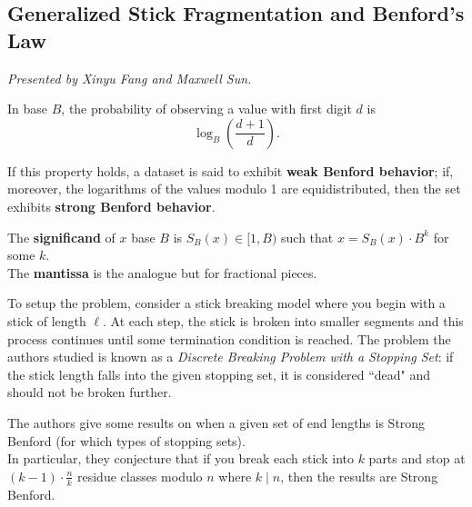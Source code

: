 \documentclass[12pt]{amsart}
\begin{document}
\vspace{2cm}

\subsection{Generalized Stick Fragmentation and Benford's Law}

\textit{}
\vspace{0.25cm}

\textit{Presented by Xinyu Fang and Maxwell Sun.}

\begin{theorem*}
In base $B$, the probability of observing a value with first digit $d$ is \[ \log_B\left(\frac{d+1}{d}\right).\]

If this property holds, a dataset is said to exhibit \textbf{weak Benford behavior}; if, moreover, the logarithms of the values modulo 1 are equidistributed, then the set exhibits \textbf{strong Benford behavior}. 
\end{theorem*}

\begin{definition}
The \textbf{significand} of $x$ base $B$ is $S_B(x) \in [1, B)$ such that $x = S_B(x) \cdot B^k$ for some $k$. \\

The \textbf{mantissa} is the analogue but for fractional pieces.
\end{definition}

\vspace{0.5cm}

To setup the problem, consider a stick breaking model where you begin with a stick of length $\ell$. At each step, the stick is broken into smaller segments and this process continues until some termination condition is reached. The problem the authors studied is known as a \textit{Discrete Breaking Problem with a Stopping Set}: if the stick length falls into the given stopping set, it is considered ``dead" and should not be broken further. \\

\begin{result*}
The authors give some results on when a given set of end lengths is Strong Benford (for which types of stopping sets). \\

In particular, they conjecture that if you break each stick into $k$ parts and stop at $(k-1) \cdot \frac{n}{k}$ residue classes modulo $n$ where $k \mid n$, then the results are Strong Benford.
\end{result*}
\end{document}

